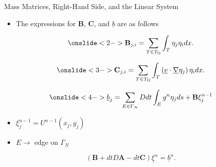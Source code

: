 \documentclass[10pt]{beamer}
\begin{document}
\begin{frame}{ Mass Matrices, Right-Hand Side, and the Linear System} \label{MassmatRHSLinearSystem}
\begin{itemize}
\item The expressions for $\mathbf{B}$, $\mathbf{C}$, and $\underline{b}$ are as follows
\end{itemize}

\begin{equation}\onslide<2->
\mathbf{B}_{j,i} = \sum_{T \in T_{\Omega}} \int_{T} \eta_{j}\eta_{i} dx.
\end{equation}

\begin{equation}\onslide<3->
\mathbf{C}_{j,i} = \sum_{T \in T_{\Omega}}\int_{T}\left(\underline{v}\cdot \underline{\nabla}\eta_{j}\right)\eta_{i} dx.
\end{equation}

\begin{equation}\onslide<4->
\underline{b}_{j}=\sum_{E \in \Gamma_{N}} Ddt\int_{E}g^{n}\eta_{j}ds+\mathbf{B}\xi_{j}^{n-1}
\end{equation}

\begin{itemize}
\item<5-> $\xi_{j}^{n-1} = U^{n-1}\left(x_{j},y_{j}\right)$
\item<6-> $E \rightarrow$ edge on $\Gamma_{N}$
\end{itemize}
\begin{equation}
\left(\mathbf{B}+dtD\mathbf{A}-dt\mathbf{C}\right)\underline{\xi}^{n}=\underline{b}^{n}.
\end{equation}
\hyperlink{Questions}{}
\end{frame}
\end{document}
